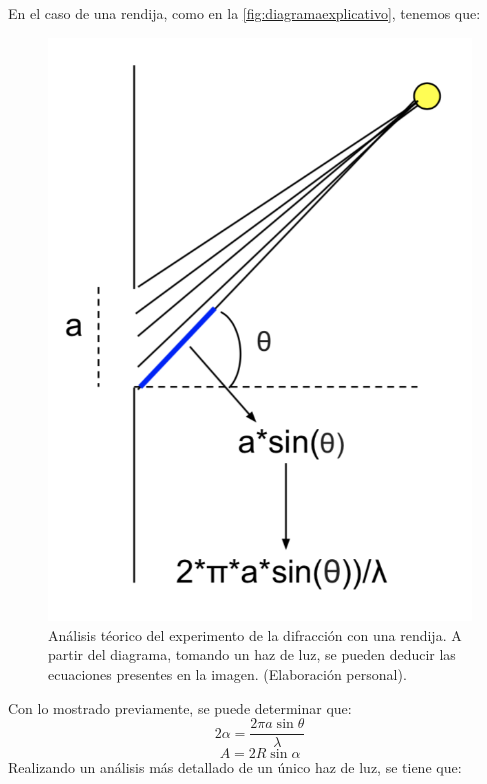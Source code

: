 \documentclass[%
 reprint,
 amsmath,amssymb,
 aps,
]{revtex4-1}
\begin{document}
En el caso de una rendija, como en la \ref{fig:diagramaexplicativo}, tenemos que:
\begin{figure}[H]
    \centering
    \includegraphics[scale= 0.5]{luz.png}
    \caption{Análisis téorico del experimento de la difracción con una rendija. A partir del diagrama, tomando un haz de luz, se pueden deducir las ecuaciones presentes en la imagen. (Elaboración personal).}
    \label{fig:figRayos}
\end{figure}
Con lo mostrado previamente, se puede determinar que:
\begin{equation}
    2\alpha = \frac{2\pi a \sin{\theta}}{\lambda}
\end{equation}
\begin{equation}
    A = 2R\sin{\alpha}
\end{equation}
Realizando un análisis más detallado de un único haz de luz, se tiene que:
\end{document}
